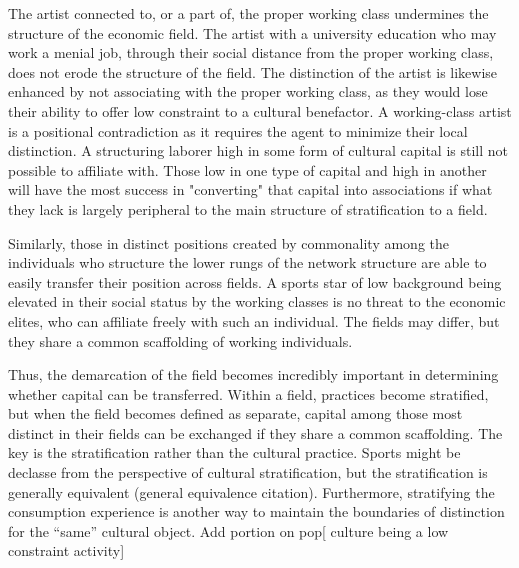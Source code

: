 \documentclass[12pt]{article}
\begin{document}
The artist connected to, or a part of, the proper working class undermines the structure of the economic field. The artist with a university education who may work a menial job, through their social distance from the proper working class, does not erode the structure of the field. The distinction of the artist is likewise enhanced by not associating with the proper working class, as they would lose their ability to offer low constraint to a cultural benefactor. A working-class artist is a positional contradiction as it requires the agent to minimize their local distinction. A structuring laborer high in some form of cultural capital is still not possible to affiliate with. Those low in one type of capital and high in another will have the most success in "converting" that capital into associations if what they lack is largely peripheral to the main structure of stratification to a field.


Similarly, those in distinct positions created by commonality among the individuals who structure the lower rungs of the network structure are able to easily transfer their position across fields. A sports star of low background being elevated in their social status by the working classes is no threat to the economic elites, who can affiliate freely with such an individual. The fields may differ, but they share a common scaffolding of working individuals.

Thus, the demarcation of the field becomes incredibly important in determining whether capital can be transferred. Within a field, practices become stratified, but when the field becomes defined as separate, capital among those most distinct in their fields can be exchanged if they share a common scaffolding. The key is the stratification rather than the cultural practice. Sports might be declasse from the perspective of cultural stratification, but the stratification is generally equivalent (general equivalence citation). Furthermore, stratifying the consumption experience is another way to maintain the boundaries of distinction for the ``same'' cultural object.  Add portion on pop[ culture being a low constraint activity]
\end{document}
